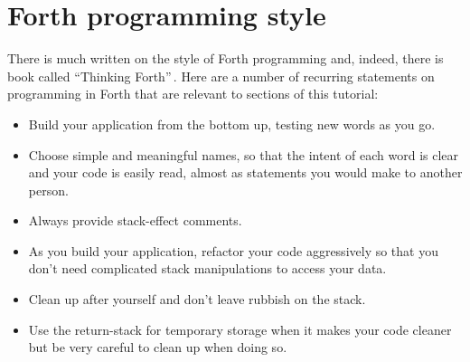 \documentclass[12pt,a4paper]{article}
\begin{document}
\section{Forth programming style}
%
There is much written on the style of Forth programming and, indeed, there is book
called ``Thinking Forth''\,\cite{brodie_2004a}.
Here are a number of recurring statements on programming in Forth that are relevant
to sections of this tutorial:
\begin{itemize}
 \item Build your application from the bottom up, testing new words as you go.
 \item Choose simple and meaningful names, so that the intent of each word is clear
   and your code is easily read, almost as statements you would make to another person.
 \item Always provide stack-effect comments.
 \item As you build your application, refactor your code aggressively so that you
   don't need complicated stack manipulations to access your data.
 \item Clean up after yourself and don't leave rubbish on the stack.
 \item Use the return-stack for temporary storage when it makes your code cleaner
   but be very careful to clean up when doing so.
\end{itemize}


\newpage


\end{document}
